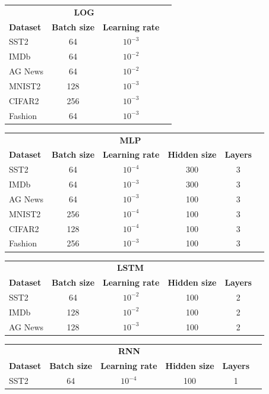 \documentclass[../main.tex]{subfiles}
\begin{document}
\begin{table}[h!]
\centering
\begin{tabular}{lccc}
\toprule
\multicolumn{3}{c}{\textbf{LOG}} \\
\textbf{Dataset} & \textbf{Batch size} & \textbf{Learning rate} \\
\midrule
SST2 & 64 & $10^{-3}$ \\
IMDb & 64 & $10^{-2}$ \\
AG News & 64 & $10^{-2}$ \\
MNIST2 & 128 & $10^{-3}$ \\
CIFAR2 & 256 & $10^{-3}$ \\
Fashion & 64 & $10^{-3}$ \\
\bottomrule
\end{tabular}
\begin{tabular}{lccccc}
\toprule
\multicolumn{5}{c}{\textbf{MLP}} \\
\textbf{Dataset} & \textbf{Batch size} & \textbf{Learning rate} & \textbf{Hidden size} & \textbf{Layers} \\
\midrule
SST2 & 64 & $10^{-4}$ & 300 & 3 \\
IMDb & 64 & $10^{-3}$ & 300 & 3 \\
AG News & 64 & $10^{-3}$ & 100 & 3 \\
MNIST2 & 256 & $10^{-4}$ & 100 & 3 \\
CIFAR2 & 128 & $10^{-4}$ & 100 & 3 \\
Fashion & 256 & $10^{-3}$ & 100 & 3 \\
\bottomrule
\end{tabular}
\begin{tabular}{lccccc}
\toprule
\multicolumn{5}{c}{\textbf{LSTM}} \\
\textbf{Dataset} & \textbf{Batch size} & \textbf{Learning rate} & \textbf{Hidden size} & \textbf{Layers} \\
\midrule
SST2 & 64 & $10^{-2}$ & 100 & 2 \\
IMDb & 128 & $10^{-2}$ & 100 & 2 \\
AG News & 128 & $10^{-3}$ & 100 & 2 \\
\bottomrule
\end{tabular}
\begin{tabular}{lccccc}
\toprule
\multicolumn{5}{c}{\textbf{RNN}} \\
\textbf{Dataset} & \textbf{Batch size} & \textbf{Learning rate} & \textbf{Hidden size} & \textbf{Layers} \\
\midrule
SST2 & 64 & $10^{-4}$ & 100 & 1 \\

\end{tabular}
\end{table}
\end{document}
